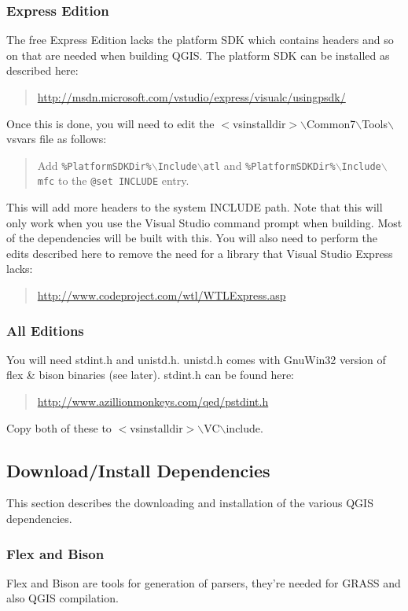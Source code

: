\subsubsection{Express Edition}
The free Express Edition lacks the platform SDK which contains headers and so on that are needed when building QGIS. The platform SDK can be installed as described here:

	\begin{quotation}
\url{http://msdn.microsoft.com/vstudio/express/visualc/usingpsdk/}
	\end{quotation}
Once this is done, you will need to edit the $<$vsinstalldir$>$$\backslash$Common7$\backslash$Tools$\backslash$vsvars file as follows:

	\begin{quotation}
Add \texttt{\%PlatformSDKDir\%$\backslash$Include$\backslash$atl} and \texttt{\%PlatformSDKDir\%$\backslash$Include$\backslash$mfc} to the \texttt{@set INCLUDE} entry.
	\end{quotation}
This will add more headers to the system INCLUDE path. Note that this will only work when you use the Visual Studio command prompt when building. Most of the dependencies will be built with this.
You will also need to perform the edits described here to remove the need for a library that Visual Studio Express lacks:

\begin{quotation}
\url{http://www.codeproject.com/wtl/WTLExpress.asp}
\end{quotation}

\subsubsection{All Editions}
You will need stdint.h and unistd.h. unistd.h comes with GnuWin32 version of flex \& bison binaries (see later). stdint.h can be found here:

\begin{quotation}
\url{http://www.azillionmonkeys.com/qed/pstdint.h}
\end{quotation}
Copy both of these to $<$vsinstalldir$>$$\backslash$VC$\backslash$include.

\subsection{Download/Install Dependencies}
This section describes the downloading and installation of the various QGIS dependencies.

\subsubsection{Flex and Bison}
Flex and Bison are tools for generation of parsers, they're needed for GRASS and also QGIS compilation.

